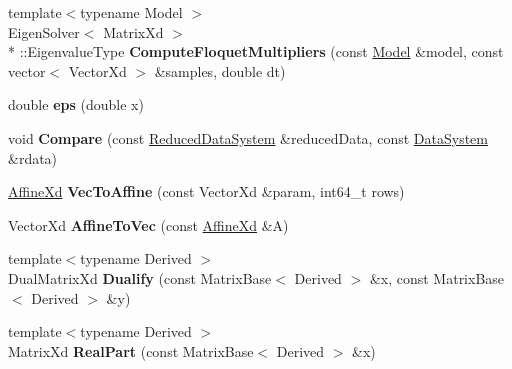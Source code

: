 \begin{DoxyCompactItemize}
\item 
\hypertarget{namespace_d_r_d_s_p_a61ce84478bd3ef4cb21b85daf3c72349}{{\footnotesize template$<$typename Model $>$ }\\Eigen\-Solver$<$ Matrix\-Xd $>$\\*
\-::Eigenvalue\-Type {\bfseries Compute\-Floquet\-Multipliers} (const \hyperlink{struct_d_r_d_s_p_1_1_model}{Model} \&model, const vector$<$ Vector\-Xd $>$ \&samples, double dt)}\label{namespace_d_r_d_s_p_a61ce84478bd3ef4cb21b85daf3c72349}

\item 
\hypertarget{namespace_d_r_d_s_p_a3b30bed0190ad5f81bf7d2f7c53eaf7c}{double {\bfseries eps} (double x)}\label{namespace_d_r_d_s_p_a3b30bed0190ad5f81bf7d2f7c53eaf7c}

\item 
\hypertarget{namespace_d_r_d_s_p_aa45917cc76977abca1d6febb472ef839}{void {\bfseries Compare} (const \hyperlink{struct_d_r_d_s_p_1_1_reduced_data_system}{Reduced\-Data\-System} \&reduced\-Data, const \hyperlink{struct_d_r_d_s_p_1_1_data_system}{Data\-System} \&rdata)}\label{namespace_d_r_d_s_p_aa45917cc76977abca1d6febb472ef839}

\item 
\hypertarget{namespace_d_r_d_s_p_a8c85f0ae74d0e946dc8ca335611d8092}{\hyperlink{struct_d_r_d_s_p_1_1_affine}{Affine\-Xd} {\bfseries Vec\-To\-Affine} (const Vector\-Xd \&param, int64\-\_\-t rows)}\label{namespace_d_r_d_s_p_a8c85f0ae74d0e946dc8ca335611d8092}

\item 
\hypertarget{namespace_d_r_d_s_p_a2ca1e4d504de3a501bdbd60a87fdddf5}{Vector\-Xd {\bfseries Affine\-To\-Vec} (const \hyperlink{struct_d_r_d_s_p_1_1_affine}{Affine\-Xd} \&A)}\label{namespace_d_r_d_s_p_a2ca1e4d504de3a501bdbd60a87fdddf5}

\item 
\hypertarget{namespace_d_r_d_s_p_afc669f9f4960f272232d92a693e07b41}{{\footnotesize template$<$typename Derived $>$ }\\Dual\-Matrix\-Xd {\bfseries Dualify} (const Matrix\-Base$<$ Derived $>$ \&x, const Matrix\-Base$<$ Derived $>$ \&y)}\label{namespace_d_r_d_s_p_afc669f9f4960f272232d92a693e07b41}

\item 
\hypertarget{namespace_d_r_d_s_p_a5a4a504382ad5845be8d509a341f2ae3}{{\footnotesize template$<$typename Derived $>$ }\\Matrix\-Xd {\bfseries Real\-Part} (const Matrix\-Base$<$ Derived $>$ \&x)}\label{namespace_d_r_d_s_p_a5a4a504382ad5845be8d509a341f2ae3}


\end{DoxyCompactItemize}
